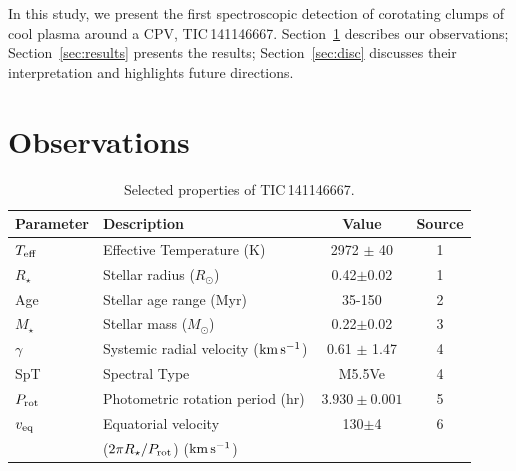 \documentclass[11pt,twocolumn,tighten]{aastex7}
\newcommand{\kms}{\ensuremath{\rm km\,s^{-1}}}
\begin{document}
In this study, we present the first spectroscopic detection of
corotating clumps of cool plasma around a CPV, TIC\,141146667.
Section~\ref{sec:obs} describes our observations;
Section~\ref{sec:results} presents the results; Section~\ref{sec:disc}
discusses their interpretation and highlights future directions.


\section{Observations}
\label{sec:obs}

\begin{table}
\small
\setlength{\tabcolsep}{2pt}
\centering
  \caption{Selected properties of TIC\,141146667.}
\vspace{-0.2cm}
\label{tab:params}
\begin{tabular}{llcc}
\hline \hline
Parameter & Description & Value & Source\\
\hline 
%
$T_{\rm eff}$\dotfill                   & Effective Temperature (K) \hspace{9pt}\dotfill                 & 2972 $\pm$ 40    & 1 \\
%
$R_\star$\dotfill                       & Stellar radius ($R_\odot$)\dotfill                             & 0.42$\pm$0.02    & 1 \\
%
Age                                     & Stellar age range (Myr)\dotfill                                & 35-150           & 2 \\
%
$M_\star$\dotfill                       & Stellar mass ($M_\odot$)\dotfill                               & 0.22$\pm$0.02    & 3 \\
%
$\gamma$\dotfill                        & Systemic radial velocity (\kms)\dotfill                        & 0.61 $\pm$ 1.47  & 4 \\
%
SpT\dotfill                             & Spectral Type\dotfill                                          & M5.5Ve           & 4 \\
%
$P_{\rm rot}$\dotfill                   & Photometric rotation period (hr)\dotfill                       & $3.930\pm 0.001$ & 5 \\
%
$v_{\rm eq}$\dotfill		                & Equatorial velocity \dotfill                                   &  130$\pm$4       & 6 \\
                                        & \hspace{3pt} ($2\pi R_\star/P_{\rm rot}$) (\kms)	             &                      \\

\end{tabular}
\end{table}
\end{document}
